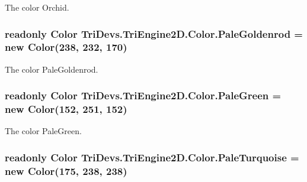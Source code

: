 The color Orchid. 

\hypertarget{struct_tri_devs_1_1_tri_engine2_d_1_1_color_aca1543ce244357bae5c677b047212226}{
\subsubsection[{Pale\-Goldenrod}]{\setlength{\rightskip}{0pt plus 5cm}readonly {\bf Color} Tri\-Devs.\-Tri\-Engine2\-D.\-Color.\-Pale\-Goldenrod = new {\bf Color}(238, 232, 170)\hspace{0.3cm}{\ttfamily [static]}}}\label{struct_tri_devs_1_1_tri_engine2_d_1_1_color_aca1543ce244357bae5c677b047212226}


The color Pale\-Goldenrod. 

\hypertarget{struct_tri_devs_1_1_tri_engine2_d_1_1_color_a31ee964afbf9fae6036dca9b519acd6e}{
\subsubsection[{Pale\-Green}]{\setlength{\rightskip}{0pt plus 5cm}readonly {\bf Color} Tri\-Devs.\-Tri\-Engine2\-D.\-Color.\-Pale\-Green = new {\bf Color}(152, 251, 152)\hspace{0.3cm}{\ttfamily [static]}}}\label{struct_tri_devs_1_1_tri_engine2_d_1_1_color_a31ee964afbf9fae6036dca9b519acd6e}


The color Pale\-Green. 

\hypertarget{struct_tri_devs_1_1_tri_engine2_d_1_1_color_a236d865062f8734a0f87bfee844af9f6}{
\subsubsection[{Pale\-Turquoise}]{\setlength{\rightskip}{0pt plus 5cm}readonly {\bf Color} Tri\-Devs.\-Tri\-Engine2\-D.\-Color.\-Pale\-Turquoise = new {\bf Color}(175, 238, 238)\hspace{0.3cm}{\ttfamily [static]}}}\label{struct_tri_devs_1_1_tri_engine2_d_1_1_color_a236d865062f8734a0f87bfee844af9f6}


